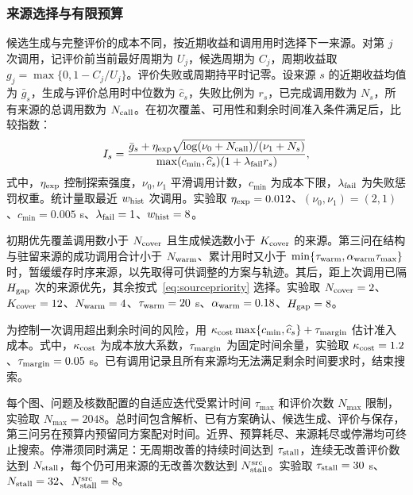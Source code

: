 \subsubsection{来源选择与有限预算}
候选生成与完整评价的成本不同，按近期收益和调用用时选择下一来源。对第 $j$ 次调用，记评价前当前最好周期为 $U_j$，候选周期为 $C_j$，周期收益取 $g_j=\max\{0,1-C_j/U_j\}$。评价失败或周期持平时记零。设来源 $s$ 的近期收益均值为 $\bar g_s$，生成与评价总用时中位数为 $\widehat c_s$，失败比例为 $r_s$，已完成调用数为 $N_s$，所有来源的总调用数为 $N_{\rm call}$。在初次覆盖、可用性和剩余时间准入条件满足后，比较指数：
\begin{equation}
 I_s=\frac{\bar g_s+\eta_{\rm exp}\sqrt{\log(\nu_0+N_{\rm call})/(\nu_1+N_s)}}{
 \max(c_{\min},\widehat c_s)(1+\lambda_{\rm fail}r_s)},
 \label{eq:sourcepriority}
\end{equation}
\noindent 式中，$\eta_{\rm exp}$ 控制探索强度，$\nu_0,\nu_1$ 平滑调用计数，$c_{\min}$ 为成本下限，$\lambda_{\rm fail}$ 为失败惩罚权重。统计量取最近 $w_{\rm hist}$ 次调用。实验取 $\eta_{\rm exp}=0.012$、$(\nu_0,\nu_1)=(2,1)$、$c_{\min}=0.005$ s、$\lambda_{\rm fail}=1$、$w_{\rm hist}=8$。

初期优先覆盖调用数小于 $N_{\rm cover}$ 且生成候选数小于 $K_{\rm cover}$ 的来源。第三问在结构与驻留来源的成功调用合计小于 $N_{\rm warm}$、累计用时又小于 $\min\{\tau_{\rm warm},\alpha_{\rm warm}\tau_{\max}\}$ 时，暂缓缓存时序来源，以先取得可供调整的方案与轨迹。其后，距上次调用已隔 $H_{\rm gap}$ 次的来源优先，其余按式~\eqref{eq:sourcepriority} 选择。实验取 $N_{\rm cover}=2$、$K_{\rm cover}=12$、$N_{\rm warm}=4$、$\tau_{\rm warm}=20$ s、$\alpha_{\rm warm}=0.18$、$H_{\rm gap}=8$。

为控制一次调用超出剩余时间的风险，用 $\kappa_{\rm cost}\max\{c_{\min},\widehat c_s\}+\tau_{\rm margin}$ 估计准入成本。式中，$\kappa_{\rm cost}$ 为成本放大系数，$\tau_{\rm margin}$ 为固定时间余量，实验取 $\kappa_{\rm cost}=1.2$、$\tau_{\rm margin}=0.05$ s。已有调用记录且所有来源均无法满足剩余时间要求时，结束搜索。

每个图、问题及核数配置的自适应迭代受累计时间 $\tau_{\max}$ 和评价次数 $N_{\max}$ 限制，实验取 $N_{\max}=2048$。总时间包含解析、已有方案确认、候选生成、评价与保存，第三问另在预算内预留同方案配对时间。近界、预算耗尽、来源耗尽或停滞均可终止搜索。停滞须同时满足：无周期改善的持续时间达到 $\tau_{\rm stall}$，连续无改善评价数达到 $N_{\rm stall}$，每个仍可用来源的无改善次数达到 $N_{\rm stall}^{\rm src}$。实验取 $\tau_{\rm stall}=30$ s、$N_{\rm stall}=32$、$N_{\rm stall}^{\rm src}=8$。

